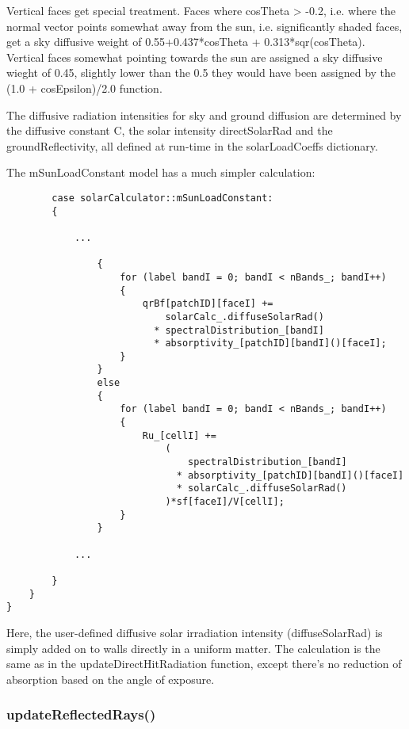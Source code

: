 Vertical faces get special treatment. Faces where cosTheta > -0.2, i.e. where the normal vector points somewhat away from the sun, i.e. significantly shaded faces, get a sky diffusive weight of 0.55+0.437*cosTheta + 0.313*sqr(cosTheta). Vertical faces somewhat pointing towards the sun are assigned a sky diffusive wieght of 0.45, slightly lower than the 0.5 they would have been assigned by the (1.0 + cosEpsilon)/2.0 function.

The diffusive radiation intensities for sky and ground diffusion are determined by the diffusive constant C, the solar intensity directSolarRad and the groundReflectivity, all defined at run-time in the solarLoadCoeffs dictionary.

The mSunLoadConstant model has a much simpler calculation:

\begin{verbatim}
        case solarCalculator::mSunLoadConstant:
        {
        
            ...
            
                {
                    for (label bandI = 0; bandI < nBands_; bandI++)
                    {
                        qrBf[patchID][faceI] +=
                            solarCalc_.diffuseSolarRad()
                          * spectralDistribution_[bandI]
                          * absorptivity_[patchID][bandI]()[faceI];
                    }
                }
                else
                {
                    for (label bandI = 0; bandI < nBands_; bandI++)
                    {
                        Ru_[cellI] +=
                            (
                                spectralDistribution_[bandI]
                              * absorptivity_[patchID][bandI]()[faceI]
                              * solarCalc_.diffuseSolarRad()
                            )*sf[faceI]/V[cellI];
                    }
                }
                
            ...   
                    
        }
    }
}
\end{verbatim}

Here, the user-defined diffusive solar irradiation intensity (diffuseSolarRad) is simply added on to walls directly in a uniform matter. The calculation is the same as in the updateDirectHitRadiation function, except there's no reduction of absorption based on the angle of exposure.

\subsubsection{updateReflectedRays()}

